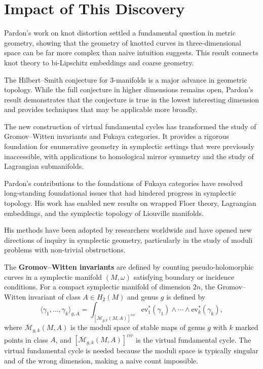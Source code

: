 \section{Impact of This Discovery}

Pardon's work on knot distortion settled a fundamental question in metric geometry, showing that the geometry of knotted curves in three-dimensional space can be far more complex than naive intuition suggests. This result connects knot theory to bi-Lipschitz embeddings and coarse geometry.

The Hilbert--Smith conjecture for 3-manifolds is a major advance in geometric topology. While the full conjecture in higher dimensions remains open, Pardon's result demonstrates that the conjecture is true in the lowest interesting dimension and provides techniques that may be applicable more broadly.

The new construction of virtual fundamental cycles has transformed the study of Gromov--Witten invariants and Fukaya categories. It provides a rigorous foundation for enumerative geometry in symplectic settings that were previously inaccessible, with applications to homological mirror symmetry and the study of Lagrangian submanifolds.

Pardon's contributions to the foundations of Fukaya categories have resolved long-standing foundational issues that had hindered progress in symplectic topology. His work has enabled new results on wrapped Floer theory, Lagrangian embeddings, and the symplectic topology of Liouville manifolds.

His methods have been adopted by researchers worldwide and have opened new directions of inquiry in symplectic geometry, particularly in the study of moduli problems with non-trivial obstructions.

The \textbf{Gromov--Witten invariants} are defined by counting pseudo-holomorphic curves in a symplectic manifold $(M, \omega)$ satisfying boundary or incidence conditions. For a compact symplectic manifold of dimension $2n$, the Gromov--Witten invariant of class $A \in H_2(M)$ and genus $g$ is defined by
\[
\langle \gamma_1, \ldots, \gamma_k \rangle_{g,A} = \int_{[\overline{\mathcal{M}}_{g,k}(M,A)]^{vir}} \mathrm{ev}_1^*(\gamma_1) \wedge \cdots \wedge \mathrm{ev}_k^*(\gamma_k),
\]
where $\overline{\mathcal{M}}_{g,k}(M,A)$ is the moduli space of stable maps of genus $g$ with $k$ marked points in class $A$, and $[\overline{\mathcal{M}}_{g,k}(M,A)]^{vir}$ is the virtual fundamental cycle. The virtual fundamental cycle is needed because the moduli space is typically singular and of the wrong dimension, making a naive count impossible.

